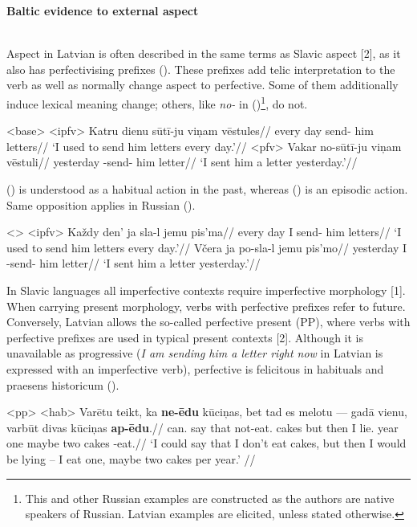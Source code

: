 \documentclass[a4paper, 12pt]{article}
\begin{document}
\begin{sloppypar}


\textbf{Baltic evidence to external aspect}\\~


Aspect in Latvian is often described in the same terms as Slavic aspect [2], as it also has
perfectivising prefixes (\nextx). These prefixes add telic interpretation to the verb as well as
normally change aspect to perfective. Some of them additionally induce lexical meaning
change; others, like \textit{no-} in ()\footnote{This and other Russian examples are constructed as the authors are native speakers of Russian. Latvian
examples are elicited, unless stated otherwise.}, do not.

\pex<base>
    \a<ipfv> \begingl
        \gla Katru dienu sūtī-ju viņam vēstules//
        \glb every day send-\Pst{} him letters//
        \glft ‘I used to send him letters every day.’//
    \endgl
    \a<pfv> \begingl
        \gla Vakar no-sūtī-ju viņam vēstuli//
        \glb yesterday \Pfv-send-\Pst{} him letter//
        \glft ‘I sent him a letter yesterday.’//
    \endgl    
\xe

() is understood as a habitual action in the past, whereas () is an episodic action. Same opposition applies in Russian (\nextx).

\pex<>
    \a<ipfv> \begingl
        \gla Každy den’ ja sla-l jemu pis’ma//
        \glb every day I send-\Pst{} him letters//
        \glft ‘I used to send him letters every day.’//
    \endgl
    \a \begingl
        \gla Včera ja po-sla-l jemu pis’mo//
        \glb yesterday I \Pfv-send-\Pst{} him letter//
        \glft ‘I sent him a letter yesterday.’//
    \endgl
\xe

In Slavic languages all imperfective contexts require imperfective morphology [1]. When carrying present morphology, verbs with
perfective prefixes refer to future. Conversely, Latvian allows the so-called perfective present (PP), where verbs with perfective prefixes are used in typical present contexts [2]. Although it is unavailable as progressive (\textit{I am sending him a letter right now} in Latvian is expressed with an imperfective verb), perfective is felicitous in habituals and praesens historicum (\nextx).

\pex<pp>
    \a<hab> \begingl
        \gla Varētu teikt, ka \textbf{ne-ēdu} kūciņas, bet tad es melotu — gadā vienu, varbūt divas kūciņas \textbf{ap-ēdu}.//
        \glb can.\Cond{} say that not-eat.\Prs{} cakes but then I lie.\Cond{} {} year one maybe two cakes \Pfv-eat.\Prs{}//
        \glft ‘I could say that I don’t eat cakes, but then I would be lying – I eat one, maybe two cakes per year.’ \trailingcitation{[2]}//
    \endgl


\end{sloppypar}
\end{document}
